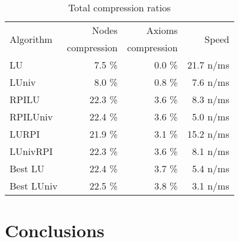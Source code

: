 \documentclass{llncs}
\begin{document}
\begin{table}[ht]
  \centering
  \begin{tabular}{lrrr}
    \toprule
    \multirow{2}{*}{Algorithm} & Nodes       & Axioms      & \multirow{2}{*}{Speed} \\
                               & compression & compression & \\
    \midrule
    LU         &  7.5 \% &  0.0 \% & 21.7 n/ms \\
    LUniv      &  8.0 \% &  0.8 \% &  7.6 n/ms \\
    RPILU      & 22.3 \% &  3.6 \% &  8.3 n/ms \\
    RPILUniv   & 22.4 \% &  3.6 \% &  5.0 n/ms \\
    LURPI      & 21.9 \% &  3.1 \% & 15.2 n/ms \\
    LUnivRPI   & 22.3 \% &  3.6 \% &  8.1 n/ms \\
    Best LU    & 22.4 \% &  3.7 \% &  5.4 n/ms \\
    Best LUniv & 22.5 \% &  3.8 \% &  3.1 n/ms \\
    \bottomrule
  \end{tabular}
  \caption{Total compression ratios}
\end{table}


%
%
%
%

\section{Conclusions}




%

%


\end{document}
